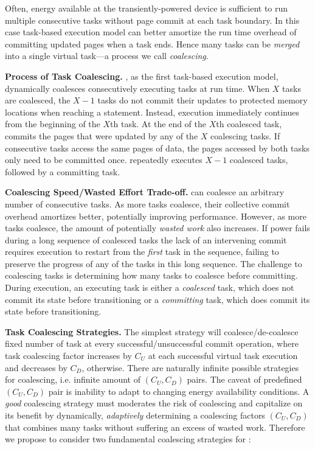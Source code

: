 Often, energy available at the transiently-powered device is sufficient to run multiple consecutive tasks without page commit at each task boundary. In this case task-based execution model can better amortize the run time overhead of committing updated pages when a task ends. Hence many tasks can be \emph{merged} into a single virtual task---a process we call \emph{coalescing}. 

\textbf{Process of Task Coalescing.} \sys, as the first task-based execution model, dynamically coalesces consecutively executing tasks at run time. When $X$ tasks are coalesced, the $X-1$ tasks do not commit their updates to protected memory locations when reaching a \transition statement. Instead, execution immediately continues from the beginning of the $X$th task. At the end of the $X$th coalesced task, \sys commits the pages that were updated by any of the $X$ coalescing tasks. If consecutive tasks access the same pages of data, the pages accessed by both tasks only need to be committed once. \sys repeatedly executes $X-1$ coalesced tasks, followed by a committing task. 

\textbf{Coalescing Speed/Wasted Effort Trade-off.} \sys can coalesce an arbitrary number of consecutive tasks. As more tasks coalesce, their collective commit overhead amortizes better, potentially improving performance. However, as more tasks coalesce, the amount of potentially {\em wasted work} also increases. If power fails during a long sequence of coalesced tasks the lack of an intervening commit requires execution to restart from the {\em first} task in the sequence, failing to preserve the progress of any of the tasks in this long sequence. The challenge to coalescing tasks is determining how many tasks to coalesce before committing. During execution, an executing task is either a {\em coalesced} task, which does not commit its state before transitioning or a {\em committing} task, which does commit its state before transitioning.

\textbf{Task Coalescing Strategies.} The simplest strategy will coalesce/de-coalesce fixed number of task at every successful/unsuccessful commit operation, where task coalescing factor increases by $C_U$ at each successful virtual task execution and decreases by $C_D$, otherwise. There are naturally infinite possible strategies for coalescing, i.e. infinite amount of $(C_U,C_D)$ pairs. The caveat of predefined $(C_U,C_D)$ pair is inability to adapt to changing energy availability conditions. A \emph{good} coalescing strategy must moderates the risk of coalescing and capitalize on its benefit by dynamically, \emph{adaptively} determining a coalescing factors $(C_U,C_D)$ that combines many tasks without suffering an excess of wasted work. Therefore we propose to consider two fundamental coalescing strategies for \sys:

